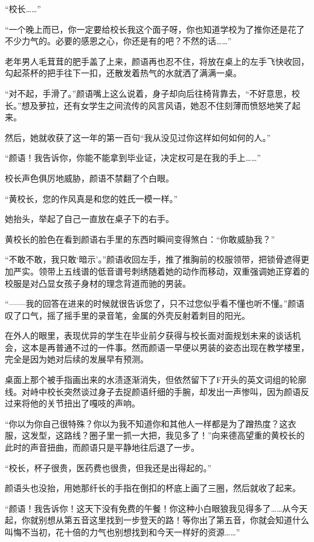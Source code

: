 \documentclass[UTF8, scheme = chinese, openany]{ctexbook}
\begin{document}
“校长……”

“一个晚上而已，你一定要给校长我这个面子呀，你也知道学校为了推你还是花了不少力气的。必要的感恩之心，你还是有的吧？不然的话……”

老年男人毛茸茸的肥手盖了上来，颜语再也忍不住，将放在桌上的左手飞快收回，勾起茶杯的把手往下一扣，还散发着热气的水就洒了满满一桌。

“对不起，手滑了。”颜语嘴上这么说着，身子却向后往椅背靠去，“不好意思，校长。”想及萝拉，还有女学生之间流传的风言风语，她忍不住刻薄而愤怒地笑了起来。

然后，她就收获了这一年的第一百句“我从没见过你这样如何如何的人。”

“颜语！我告诉你，你能不能拿到毕业证，决定权可是在我的手上……”

校长声色俱厉地威胁，颜语不禁翻了个白眼。

“黄校长，您的作风真是和您的姓氏一模一样。”

她抬头，举起了自己一直放在桌子下的右手。

黄校长的脸色在看到颜语右手里的东西时瞬间变得煞白：“你敢威胁我？”

“不敢不敢，我只敢‘暗示’。”颜语收回左手，推了推胸前的校服领带，把锁骨遮得更加严实。领带上五线谱的低音谱号刺绣随着她的动作而移动，双重强调她正穿着的校服是对凸显女孩子身材的理念背道而驰的男装。

“——我的回答在进来的时候就很告诉您了，只不过您似乎看不懂也听不懂。”颜语叹了口气，摇了摇手里的录音笔，金属的外壳反射着刺目的阳光。

在外人的眼里，表现优异的学生在毕业前夕获得与校长面对面规划未来的谈话机会，这本是再普通不过的一件事。然而颜语一早便以男装的姿态出现在教学楼里，完全是因为她对后续的发展早有预测。

桌面上那个被手指画出来的水渍逐渐消失，但依然留下了F开头的英文词组的轮廓线。对峙中校长突然谈过身子去捉颜语纤细的手腕，却发出一声惨叫，因为颜语反过来将他的关节扭出了嘎吱的声响。

“你以为你自己很特殊？你以为我不知道你和其他人一样都是为了蹭热度？这衣服，这发型，这路线？圈子里一抓一大把，我见多了！”向来德高望重的黄校长的此时的声音扭曲，而颜语只是平静地往后退了一步。

“校长，杯子很贵，医药费也很贵，但我还是出得起的。”

颜语头也没抬，用她那纤长的手指在倒扣的杯底上画了三圈，然后就收了起来。

“颜语！我告诉你！这天下没有免费的午餐！你这种小白眼狼我见得多了……从今天起，你就别想从第五音这里找到一步登天的路！等你出了第五音，你就会知道什么叫悔不当初，花十倍的力气也别想找到和今天一样好的资源……”
\end{document}
